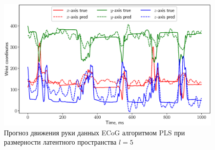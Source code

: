 \begin{figure}[ht]
	\centering
	\includegraphics[width=\textwidth]{figs/ch1/ecog_prediction}
	\caption{Прогноз движения руки данных ECoG алгоритмом PLS при размерности латентного пространства $l=5$}
	\label{ch1:fig:ecog_prediction}
\end{figure}


